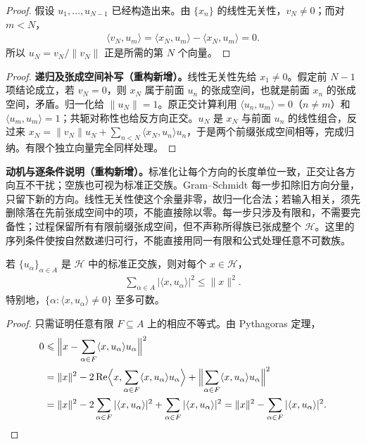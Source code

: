 \documentclass[../../main.tex]{subfiles}
\begin{document}
\begin{proof}
假设 $u_1,\ldots,u_{N-1}$ 已经构造出来。由 $\{x_n\}$ 的线性无关性，$v_N\ne0$；而对 $m<N$，
\begin{align*}
\langle v_N,u_m\rangle
=\langle x_N,u_m\rangle-\langle x_N,u_m\rangle=0.
\end{align*}
所以 $u_N=v_N/\|v_N\|$ 正是所需的第 $N$ 个向量。
\end{proof}
\begin{proof}
\textbf{递归及张成空间补写（重构新增）。}线性无关性先给 $x_1\ne0$。假定前 $N-1$ 项结论成立，若 $v_N=0$，则 $x_N$ 属于前面 $u_n$ 的张成空间，也就是前面 $x_n$ 的张成空间，矛盾。归一化给 $\|u_N\|=1$。原正交计算利用 $\langle u_n,u_m\rangle=0$（$n\ne m$）和 $\langle u_m,u_m\rangle=1$；共轭对称性也给反方向正交。$u_N$ 是 $x_N$ 与前面 $u_n$ 的线性组合，反过来 $x_N=\|v_N\|u_N+\sum_{n<N}\langle x_N,u_n\rangle u_n$，于是两个前缀张成空间相等，完成归纳。有限个独立向量完全同样处理。
\end{proof}
\begin{remark}
\textbf{动机与逐条件说明（重构新增）。}标准化让每个方向的长度单位一致，正交让各方向互不干扰；空族也可视为标准正交族。Gram--Schmidt 每一步扣除旧方向分量，只留下新的方向。线性无关性使这个余量非零，故归一化合法；若输入相关，须先删除落在先前张成空间中的项，不能直接除以零。每一步只涉及有限和，不需要完备性；过程保留所有有限前缀张成空间，但不声称所得族已张成整个 $\mathscr H$。这里的序列条件使按自然数递归可行，不能直接用同一有限和公式处理任意不可数族。
\end{remark}
\begin{theorem}\label{theorem:ch05-bessel}
若 $\{u_\alpha\}_{\alpha\in A}$ 是 $\mathscr H$ 中的标准正交族，则对每个 $x\in\mathscr H$，
\begin{align*}
\sum_{\alpha\in A}|\langle x,u_\alpha\rangle|^2\leqslant\|x\|^2.
\end{align*}
特别地，$\{\alpha:\langle x,u_\alpha\rangle\ne0\}$ 至多可数。
\end{theorem}
\begin{proof}
只需证明任意有限 $F\subseteq A$ 上的相应不等式。由 Pythagoras 定理，
\begin{align*}
0&\leqslant\Bigl\|x-\sum_{\alpha\in F}\langle x,u_\alpha\rangle u_\alpha\Bigr\|^2\\
&=\|x\|^2-2\operatorname{Re}\Bigl\langle x,\sum_{\alpha\in F}\langle x,u_\alpha\rangle u_\alpha\Bigr\rangle
+\Bigl\|\sum_{\alpha\in F}\langle x,u_\alpha\rangle u_\alpha\Bigr\|^2\\
&=\|x\|^2-2\sum_{\alpha\in F}|\langle x,u_\alpha\rangle|^2
+\sum_{\alpha\in F}|\langle x,u_\alpha\rangle|^2
=\|x\|^2-\sum_{\alpha\in F}|\langle x,u_\alpha\rangle|^2.
\end{align*}
\end{proof}
\end{document}
